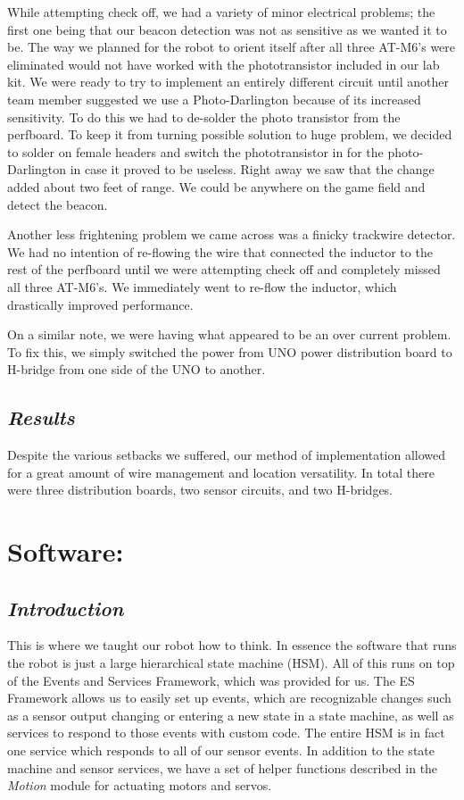 \documentclass[]{article}
\begin{document}
While attempting check off, we had a variety of minor electrical problems; the first one being that our beacon detection was not as sensitive as we wanted it to be. The way we planned for the robot to orient itself after all three AT-M6's were eliminated would not have worked with the phototransistor included in our lab kit. We were ready to try to implement an entirely different circuit until another team member suggested we use a Photo-Darlington because of its increased sensitivity. To do this we had to de-solder the photo transistor from the perfboard. To keep it from turning possible solution to huge problem, we decided to solder on female headers and switch the phototransistor in for the photo-Darlington in case it proved to be useless. Right away we saw that the change added about two feet of range. We could be anywhere on the game field and detect the beacon.

Another less frightening problem we came across was a finicky trackwire detector. We had no intention of re-flowing the wire that connected the inductor to the rest of the perfboard until we were attempting check off and completely missed all three AT-M6's. We immediately went to re-flow the inductor, which drastically improved performance.

On a similar note, we were having what appeared to be an over current problem. To fix this, we simply switched the power from UNO power distribution board to H-bridge from one side of the UNO to another.


\subsection*{\textit{Results}}
Despite the various setbacks we suffered, our method of implementation allowed for a great amount of wire management and location versatility. In total there were three distribution boards, two sensor circuits, and two H-bridges. 


\section{Software:}
\subsection*{\textit{Introduction}}
This is where we taught our robot how to think. In essence the software that runs the robot is just a large hierarchical state machine (HSM). All of this runs on top of the Events and Services Framework, which was provided for us. The ES Framework allows us to easily set up events, which are recognizable changes such as a sensor output changing or entering a new state in a state machine, as well as services to respond to those events with custom code. The entire HSM is in fact one service which responds to all of our sensor events. In addition to the state machine and sensor services, we have a set of helper functions described in the \textit{Motion} module for actuating motors and servos.
\end{document}
